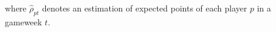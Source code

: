 where $\hat{\rho}_{pt}$ denotes an estimation of expected points of each player $p$ in a gameweek $t$.

